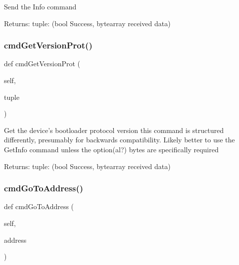 \begin{DoxyVerb}Send the Info command

Returns:
    tuple: (bool Success, bytearray received data)
\end{DoxyVerb}
 \mbox{\label{classstm__tools_1_1serialflasher_1_1serialtool_1_1SerialTool_a232f400cabb6f4d95701e1466e0aa056}} 
\subsubsection{\texorpdfstring{cmd\+Get\+Version\+Prot()}{cmdGetVersionProt()}}
{\footnotesize\ttfamily def cmd\+Get\+Version\+Prot (\begin{DoxyParamCaption}\item[{}]{self,  }\item[{}]{tuple }\end{DoxyParamCaption})}

\begin{DoxyVerb}Get the device's bootloader protocol version
this command is structured differently, presumably for backwards
compatibility. Likely better to use the GetInfo command unless the
option(al?) bytes are specifically required

Returns:
     tuple: (bool Success, bytearray received data)
\end{DoxyVerb}
 \mbox{\label{classstm__tools_1_1serialflasher_1_1serialtool_1_1SerialTool_a9d83898b55e0669d5871dce375eeccd8}} 
\subsubsection{\texorpdfstring{cmd\+Go\+To\+Address()}{cmdGoToAddress()}}
{\footnotesize\ttfamily def cmd\+Go\+To\+Address (\begin{DoxyParamCaption}\item[{}]{self,  }\item[{}]{address }\end{DoxyParamCaption})}

